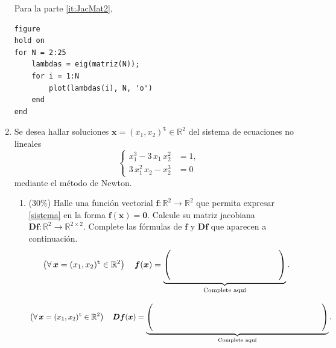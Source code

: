\documentclass[letter,11pt]{article}
\begin{document}
\begin{enumerate}
Para la parte \ref{it:JacMat2},
\begin{lstlisting}
figure
hold on
for N = 2:25
    lambdas = eig(matriz(N));
    for i = 1:N
        plot(lambdas(i), N, 'o')
    end
end
\end{lstlisting}


\item
Se desea hallar soluciones $\boldsymbol{x} = (x_1, x_2)^\mathtt{t} \in \mathbb{R}^2$ del sistema de ecuaciones no lineales
%
\begin{equation}\label{sistema}
\left\{
\begin{aligned}
x_1^3 - 3 \, x_1 \, x_2^2 & = 1,\\
3 \, x_1^2 \, x_2 - x_2^3 & = 0
\end{aligned}
\right.
\end{equation}
%
mediante el m\'etodo de Newton.

\begin{enumerate}
\item\label{it:f_and_Df} (30\%) Halle una funci\'on vectorial $\boldsymbol{f} \colon \mathbb{R}^2 \to \mathbb{R}^2$ que permita expresar \eqref{sistema} en la forma $\boldsymbol{f}(\boldsymbol{x}) = \boldsymbol{0}$.
Calcule su matriz jacobiana $\boldsymbol{D} \boldsymbol{f} \colon \mathbb{R}^2 \to \mathbb{R}^{2 \times 2}$.
Complete las f\'ormulas de $\boldsymbol{f}$ y $\boldsymbol{D} \boldsymbol{f}$ que aparecen a continuaci\'on.
%
\newcommand{\anchoextra}{\rule{3em}{0pt}}
\begin{equation}\label{f}
\left(\forall\,\boldsymbol{x} = (x_1, x_2)^\mathtt{t} \in \mathbb{R}^2\right) \quad \boldsymbol{f}(\boldsymbol{x}) =
\underbrace{%
\begin{pmatrix}
\anchoextra\phantom{x_1^3 - 3 \, x_1 \, x_2^2 - 1}\anchoextra\\[3ex]
\anchoextra\phantom{3 \, x_1^2 \, x_2 - x_2^3}\anchoextra
\end{pmatrix}}_{\text{Complete aqu\'i}}.
\end{equation}

\begin{equation}\label{Df}
\left(\forall\,\boldsymbol{x} = (x_1, x_2)^\mathtt{t} \in \mathbb{R}^2\right) \quad \boldsymbol{D} \boldsymbol{f}(\boldsymbol{x}) =
\underbrace{%
\begin{pmatrix}
\anchoextra\phantom{3\, x_1^2 - 3\, x_2^2}\anchoextra & \anchoextra\phantom{-6 \, x_1 \, x_2}\anchoextra\\[3ex]
\anchoextra\phantom{6 \, x_1 \, x_2}\anchoextra & \anchoextra\phantom{3\, x_1^2 - 3 \, x_2^2}\anchoextra
\end{pmatrix}}_{\text{Complete aqu\'i}}.
\end{equation}


\end{enumerate}
\end{enumerate}
\end{document}

